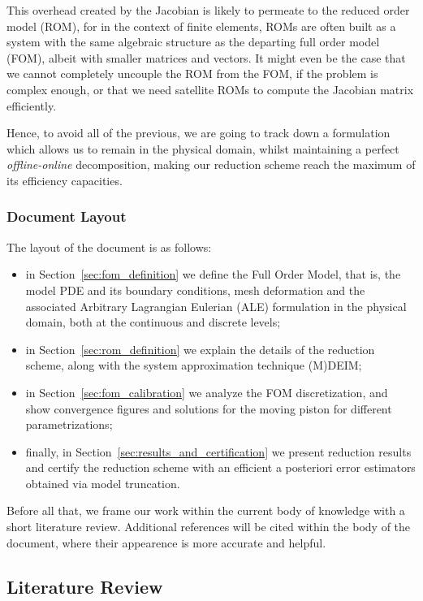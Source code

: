 \documentclass[thesis.tex]{subfiles}
\begin{document}
This overhead created by the Jacobian is likely to permeate to the reduced order model (ROM),
for in the context of finite elements, ROMs are often built as a system with the same algebraic structure
as the departing full order model (FOM),
albeit with smaller matrices and vectors. 
It might even be the case that we cannot completely uncouple the ROM from the FOM, 
if the problem is complex enough, or that we need satellite ROMs to compute the Jacobian matrix efficiently.

Hence, to avoid all of the previous, 
we are going to track down a formulation which allows us to remain in the physical domain, 
whilst maintaining a perfect \textit{offline-online} decomposition,
making our reduction scheme reach the maximum of its efficiency capacities.

\subsubsection{Document Layout}
The layout of the document is as follows:
\begin{itemize}
    \item in Section~\ref{sec:fom_definition} we define the Full Order Model, that is, 
    the model PDE and its boundary conditions, 
    mesh deformation and the associated Arbitrary Lagrangian Eulerian (ALE) formulation
    in the physical domain,
    both at the continuous and discrete levels;
    \item in Section~\ref{sec:rom_definition} we explain the details of the reduction scheme, 
    along with the system approximation technique (M)DEIM;
    \item in Section~\ref{sec:fom_calibration} we analyze the FOM discretization, 
    and show convergence figures and solutions for the moving piston for different parametrizations;
    \item finally, in Section~\ref{sec:results_and_certification} we present reduction results
    and certify the reduction scheme with an efficient a posteriori error estimators obtained via model truncation.
\end{itemize}
Before all that, we frame our work within the current body of knowledge 
with a short literature review.
Additional references will be cited within the body of the document, 
where their appearence is more accurate and helpful.  

\subsection{Literature Review}

\end{document}
